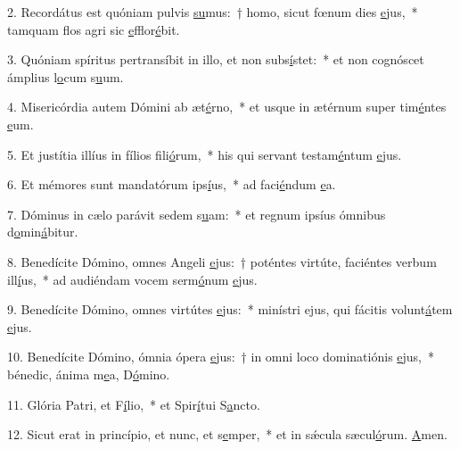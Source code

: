 2. Recordátus est quóniam pulvis \uline{su}mus:~† homo, sicut fœnum dies \uline{e}jus,~* tamquam flos agri sic \uline{e}fflor\uline{é}bit.\par 
3. Quóniam spíritus pertransíbit in illo, et non subs\uline{í}stet:~* et non cognóscet ámplius l\uline{o}cum s\uline{u}um.\par 
4. Misericórdia autem Dómini ab æt\uline{é}rno,~* et usque in ætérnum super tim\uline{é}ntes \uline{e}um.\par 
5. Et justítia illíus in fílios fili\uline{ó}rum,~* his qui servant testam\uline{é}ntum \uline{e}jus.\par 
6. Et mémores sunt mandatórum ips\uline{í}us,~* ad faci\uline{é}ndum \uline{e}a.\par 
7. Dóminus in cælo parávit sedem s\uline{u}am:~* et regnum ipsíus ómnibus d\uline{o}min\uline{á}bitur.\par 
8. Benedícite Dómino, omnes Angeli \uline{e}jus:~† poténtes virtúte, faciéntes verbum ill\uline{í}us,~* ad audiéndam vocem serm\uline{ó}num \uline{e}jus.\par 
9. Benedícite Dómino, omnes virtútes \uline{e}jus:~* minístri ejus, qui fácitis volunt\uline{á}tem \uline{e}jus.\par 
10. Benedícite Dómino, ómnia ópera \uline{e}jus:~† in omni loco dominatiónis \uline{e}jus,~* bénedic, ánima m\uline{e}a, D\uline{ó}mino.\par 
11. Glória Patri, et F\uline{í}lio,~* et Spir\uline{í}tui S\uline{a}ncto.\par 
12. Sicut erat in princípio, et nunc, et s\uline{e}mper,~* et in sǽcula sæcul\uline{ó}rum. \uline{A}men.\par 
